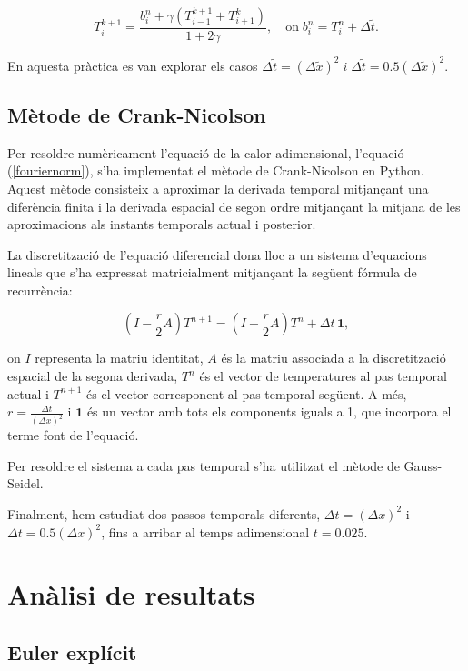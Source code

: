 \documentclass[a4paper,11pt,oneside]{article}
\begin{document}
\begin{equation}
    T_i^{k+1} = \frac{b_i^n + \gamma \left(T_{i-1}^{k+1} + T_{i+1}^k\right)}{1 + 2\gamma}, \quad \text{on} \; b_i^n = T_i^n + \Delta\tilde{t}.
\end{equation}

En aquesta pràctica es van explorar els casos $\Delta\tilde{t} = \left(\Delta\tilde{x}\right)^2 \; i \; \Delta\tilde{t} = 0.5 \left(\Delta\tilde{x}\right)^2$.



\subsection{Mètode de Crank-Nicolson}

Per resoldre numèricament l’equació de la calor adimensional, l'equació (\ref{fouriernorm}), s’ha implementat el mètode de 
Crank-Nicolson en Python. Aquest mètode consisteix a aproximar la derivada temporal mitjançant una diferència finita i la 
derivada espacial de segon ordre mitjançant la mitjana de les aproximacions als instants temporals actual i posterior.

La discretització de l’equació diferencial dona lloc a un sistema d’equacions lineals que s’ha expressat matricialment mitjançant 
la següent fórmula de recurrència:

\[
\left(I-\frac{r}{2}A\right)T^{n+1}
=
\left(I+\frac{r}{2}A\right)T^n
+\Delta t\,\mathbf{1},
\]

on \(I\) representa la matriu identitat, \(A\) és la matriu associada a la discretització espacial de la segona derivada, 
\(T^n\) és el vector de temperatures al pas temporal actual i \(T^{n+1}\) és el vector corresponent al pas temporal següent. 
A més, \(r=\frac{\Delta t}{(\Delta x)^2}\) i \(\mathbf{1}\) és un vector amb tots els components iguals a 1, que incorpora el 
terme font de l’equació.

Per resoldre el sistema a cada pas temporal s’ha utilitzat el mètode de Gauss-Seidel.

Finalment, hem estudiat dos passos temporals diferents, \(\Delta t=(\Delta x)^2\) i \(\Delta t=0.5(\Delta x)^2\), fins a 
arribar al temps adimensional \(t=0.025\).

\section{Anàlisi de resultats}

\subsection{Euler explícit}
\end{document}
